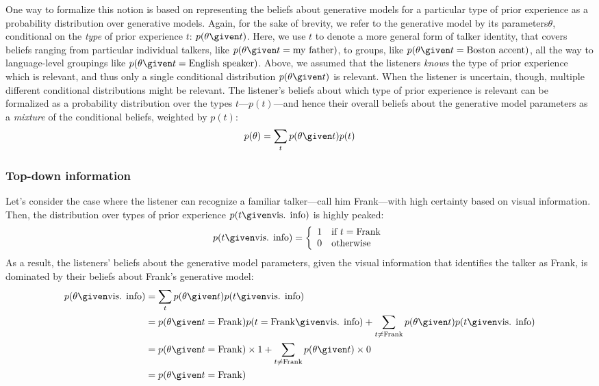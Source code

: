 One way to formalize this notion is based on representing the beliefs about generative models for a particular type of prior experience as a probability distribution over generative models.  Again, for the sake of brevity, we refer to the generative model by its parameters\footnotemark[\ref{note:gen-mod-params}] $\theta$, conditional on the \emph{type} of prior experience $t$: $p(\theta\given t)$.  Here, we use $t$ to denote a more general form of talker identity, that covers beliefs ranging from particular individual talkers, like $p(\theta \given t=\mathrm{my\ father})$, to groups, like $p(\theta \given t=\textrm{Boston accent})$, all the way to language-level groupings like $p(\theta \given t=\textrm{English speaker})$.  Above, we assumed that the listeners \emph{knows} the type of prior experience which is relevant, and thus only a single conditional distribution $p(\theta \given t)$ is relevant.  When the listener is uncertain, though, multiple different conditional distributions might be relevant.  The listener's beliefs about which type of prior experience is relevant can be formalized as a probability distribution over the types $t$---$p(t)$---and hence their overall beliefs about the generative model parameters as a \emph{mixture} of the conditional beliefs, weighted by $p(t)$: 
\begin{equation}
  \label{eq:30}
  p(\theta) = \sum_t p(\theta \given t) p(t)
\end{equation}

\subsubsection{Top-down information}
\label{sec:top-down-information}

Let's consider the case where the listener can recognize a familiar talker---call him Frank---with high certainty based on visual information.  Then, the distribution over types of prior experience $p(t \given \textrm{vis. info})$ is highly peaked:
\begin{equation}
  \label{eq:31}
  p(t \given \textrm{vis. info}) = \left \{
    \begin{array}{rl}
      1 & \textrm{if } t=\mathrm{Frank} \\
      0 & \mathrm{otherwise}
    \end{array}
  \right .
\end{equation}
As a result, the listeners' beliefs about the generative model parameters, given the visual information that identifies the talker as Frank, is dominated by their beliefs about Frank's generative model: 
\begin{align}
  \label{eq:32}
  p(\theta \given \textrm{vis. info}) &= \sum_t p(\theta \given t) p(t \given \textrm{vis. info}) \\
  &=p(\theta \given t=\mathrm{Frank}) p(t=\mathrm{Frank} \given \textrm{vis. info}) + \sum_{t \ne \mathrm{Frank}} p(\theta \given t) p(t \given \textrm{vis. info}) \\
  &= p(\theta \given t=\mathrm{Frank}) \times 1 + \sum_{t \ne \mathrm{Frank}} p(\theta \given t) \times 0 \\
  &= p(\theta \given t=\mathrm{Frank})
\end{align}

